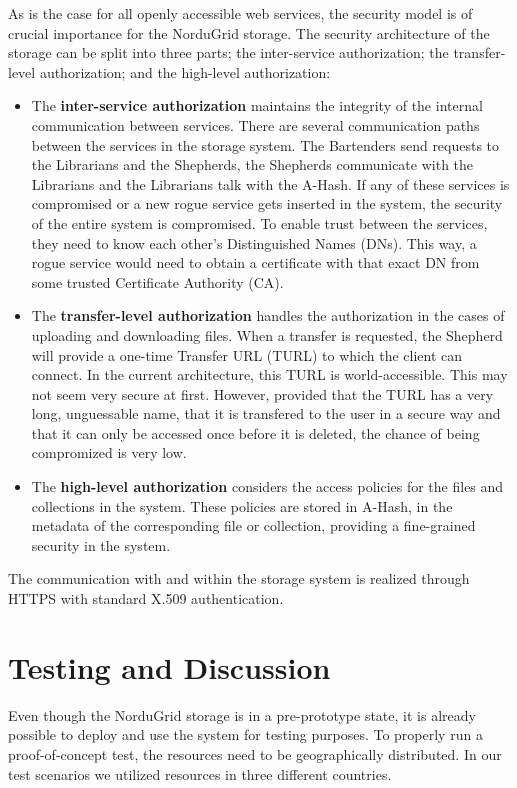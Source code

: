 \documentclass{llncs}
\begin{document}
As is the case for all openly accessible web services, the security
model is of crucial importance for the NorduGrid storage. The security
architecture of the storage can be split into three parts; the
inter-service authorization; the transfer-level authorization; and the
high-level authorization:
\begin{itemize}
\item The \textbf{inter-service authorization} maintains the integrity of the
  internal communication between services. There are several
  communication paths between the services in the storage system. The
  Bartenders send requests to the Librarians and the Shepherds, the
  Shepherds communicate with the Librarians and the Librarians talk with
  the A-Hash. If any of these services is compromised or a new
  rogue service gets inserted in the system, the security of the
  entire system is compromised. To enable trust between the services,
  they need to know each other's Distinguished Names (DNs). This way,
  a rogue service would need to obtain a certificate with that exact
  DN from some trusted Certificate Authority (CA).
\item The \textbf{transfer-level authorization} handles the
  authorization in the cases of uploading and downloading files. When
  a transfer is requested, the Shepherd will provide a one-time
  Transfer URL (TURL) to which the client can connect. In the
  current architecture, this TURL is world-accessible. This may not seem
  very secure at first. However, provided that the TURL has a very long,
  unguessable name, that it is transfered to the user in a secure way
  and that it can only be accessed once before it is deleted, the
  chance of being compromized is very low.
\item The \textbf{high-level authorization} considers the access
  policies for the files and collections in the system. These policies
  are stored in A-Hash, in the metadata of the corresponding file or
  collection, providing a fine-grained security in the system.
\end{itemize}
The communication with and within the storage system is realized
through HTTPS with standard X.509 authentication.

\section{Testing and Discussion}
\label{Testing and Discussion}

Even though the NorduGrid storage is in a pre-prototype state, it is already
possible to deploy and use the system for testing purposes. To
properly run a proof-of-concept test, the resources need to be
geographically distributed. In our test scenarios we utilized
resources in three different countries.
\end{document}
